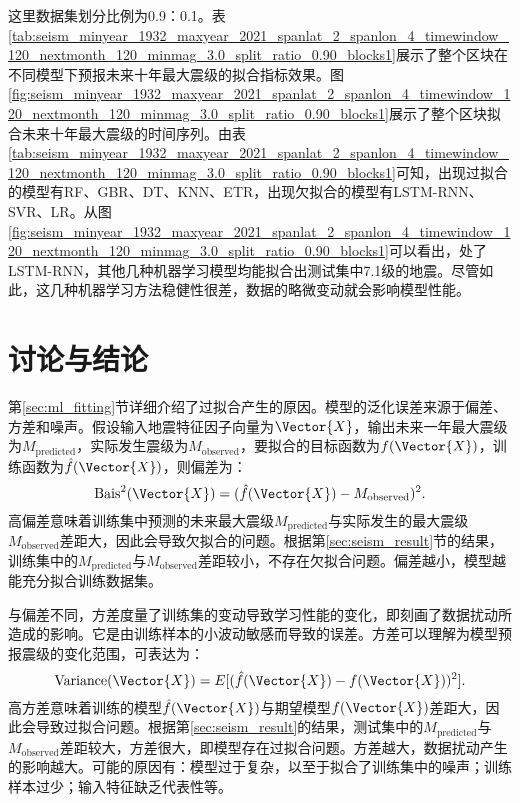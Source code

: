 这里数据集划分比例为0.9：0.1。表\ref{tab:seism_minyear_1932_maxyear_2021_spanlat_2_spanlon_4_timewindow_120_nextmonth_120_minmag_3.0_split_ratio_0.90_blocks1}展示了整个区块在不同模型下预报未来十年最大震级的拟合指标效果。图\ref{fig:seism_minyear_1932_maxyear_2021_spanlat_2_spanlon_4_timewindow_120_nextmonth_120_minmag_3.0_split_ratio_0.90_blocks1}展示了整个区块拟合未来十年最大震级的时间序列。由表\ref{tab:seism_minyear_1932_maxyear_2021_spanlat_2_spanlon_4_timewindow_120_nextmonth_120_minmag_3.0_split_ratio_0.90_blocks1}可知，出现过拟合的模型有RF、GBR、DT、KNN、ETR，出现欠拟合的模型有LSTM-RNN、SVR、LR。从图\ref{fig:seism_minyear_1932_maxyear_2021_spanlat_2_spanlon_4_timewindow_120_nextmonth_120_minmag_3.0_split_ratio_0.90_blocks1}可以看出，处了LSTM-RNN，其他几种机器学习模型均能拟合出测试集中7.1级的地震。尽管如此，这几种机器学习方法稳健性很差，数据的略微变动就会影响模型性能。

\section{讨论与结论}\label{sec:seism_conclusion}

第\ref{sec:ml_fitting}节详细介绍了过拟合产生的原因。模型的泛化误差来源于偏差、方差和噪声。假设输入地震特征因子向量为$\Vector{X}$，输出未来一年最大震级为$M_{\text{predicted}}$，实际发生震级为$M_{\text{observed}}$，要拟合的目标函数为$f(\Vector{X})$，训练函数为$\hat{f}(\Vector{X})$，则偏差为：
\begin{equation}
  \label{eq:seism_bias}
  \text{Bais}^2(\Vector{X})=(\hat{f}(\Vector{X})-M_{\text{observed}})^2.
\end{equation}
高偏差意味着训练集中预测的未来最大震级$M_{\text{predicted}}$与实际发生的最大震级$M_{\text{observed}}$差距大，因此会导致欠拟合的问题。根据第\ref{sec:seism_result}节的结果，训练集中的$M_{\text{predicted}}$与$M_{\text{observed}}$差距较小，不存在欠拟合问题。偏差越小，模型越能充分拟合训练数据集。

与偏差不同，方差度量了训练集的变动导致学习性能的变化，即刻画了数据扰动所造成的影响。它是由训练样本的小波动敏感而导致的误差。方差可以理解为模型预报震级的变化范围，可表达为：
\begin{equation}
  \label{eq:seism_variance}
  \text{Variance}(\Vector{X})=E[(\hat{f}(\Vector{X})-f(\Vector{X}))^2].
\end{equation}
高方差意味着训练的模型$\hat{f}(\Vector{X})$与期望模型$f(\Vector{X})$差距大，因此会导致过拟合问题。根据第\ref{sec:seism_result}的结果，测试集中的$M_{\text{predicted}}$与$M_{\text{observed}}$差距较大，方差很大，即模型存在过拟合问题。方差越大，数据扰动产生的影响越大。可能的原因有：模型过于复杂，以至于拟合了训练集中的噪声；训练样本过少；输入特征缺乏代表性等。

